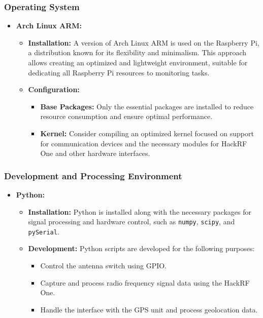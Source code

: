 \documentclass{article}
\begin{document}
\subsubsection{Operating System}
\begin{itemize}
    \item \textbf{Arch Linux ARM:}
    \begin{itemize}
        \item \textbf{Installation:} A version of Arch Linux ARM is used on the Raspberry Pi, a distribution known for its flexibility and minimalism. This approach allows creating an optimized and lightweight environment, suitable for dedicating all Raspberry Pi resources to monitoring tasks.
        \item \textbf{Configuration:}
        \begin{itemize}
            \item \textbf{Base Packages:} Only the essential packages are installed to reduce resource consumption and ensure optimal performance.
            \item \textbf{Kernel:} Consider compiling an optimized kernel focused on support for communication devices and the necessary modules for HackRF One and other hardware interfaces.
        \end{itemize}
    \end{itemize}
\end{itemize}

\subsubsection{Development and Processing Environment}
\begin{itemize}
    \item \textbf{Python:}
    \begin{itemize}
        \item \textbf{Installation:} Python is installed along with the necessary packages for signal processing and hardware control, such as \texttt{numpy}, \texttt{scipy}, and \texttt{pySerial}.
        \item \textbf{Development:} Python scripts are developed for the following purposes:
        \begin{itemize}
            \item Control the antenna switch using GPIO.
            \item Capture and process radio frequency signal data using the HackRF One.
            \item Handle the interface with the GPS unit and process geolocation data.
        \end{itemize}
    \end{itemize}
\end{itemize}
\end{document}
